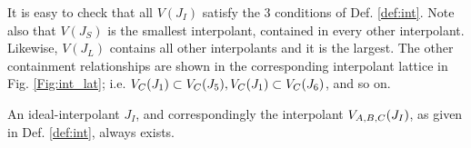 \begin{Example}
{It is easy to check  that all $V(J_I)$ satisfy the 3 conditions of
Def. \ref{def:int}. Note also that $V(J_S)$ is the smallest
interpolant, contained in every other interpolant. Likewise, $V(J_L)$
contains all other interpolants and it is the largest. The other
containment relationships are shown in the corresponding interpolant
lattice in Fig. \ref{Fig:int_lat}; i.e. ${V_C}(J_1) \subset {V_C}(J_5),
{V_C}(J_1) \subset {V_C}(J_6)$, and so on. 




}
\end{Example}






\begin{Theorem}
An ideal-interpolant $J_I$, and correspondingly the interpolant ${V_{A,B,C}}(J_I)$, as
given in Def. \ref{def:int}, always exists. 
\end{Theorem}

